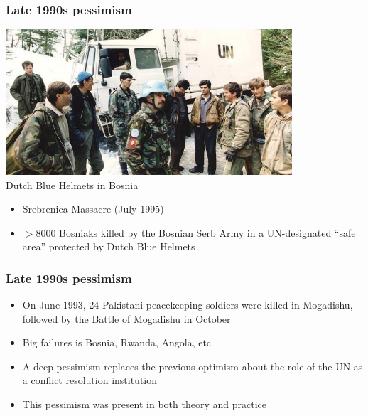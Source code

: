 \documentclass[aspectratio=43]{beamer}
\begin{document}

\begin{frame}
\frametitle{Late 1990s pessimism}
\centering

\includegraphics[width = 0.8\textwidth]{img/srebrenica-dutch-peacekeepers}\\
{\small Dutch Blue Helmets in Bosnia}

\vspace{10pt}

\begin{itemize}
  \item Srebrenica Massacre (July 1995)
  \item $>$8000 Bosniaks killed by the Bosnian Serb Army in a UN-designated ``safe area'' protected by Dutch Blue Helmets
\end{itemize}

\end{frame}

\begin{frame}
\frametitle{Late 1990s pessimism}
\centering

\begin{itemize}[<+->]
  \item On June 1993, 24 Pakistani peacekeeping soldiers were killed in Mogadishu, followed by the Battle of Mogadishu in October
  \item Big failures is Bosnia, Rwanda, Angola, etc
  \item A deep pessimism replaces the previous optimism about the role of the UN as a conflict resolution institution
  \item This pessimism was present in both theory and practice
\end{itemize}

\end{frame}
\end{document}
